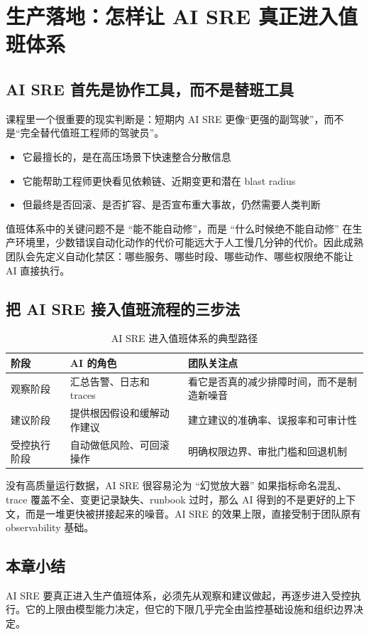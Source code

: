 \section{生产落地：怎样让 AI SRE 真正进入值班体系}

\subsection{AI SRE 首先是协作工具，而不是替班工具}

课程里一个很重要的现实判断是：短期内 AI SRE 更像“更强的副驾驶”，而不是“完全替代值班工程师的驾驶员”。

\begin{itemize}
    \item 它最擅长的，是在高压场景下快速整合分散信息
    \item 它能帮助工程师更快看见依赖链、近期变更和潜在 blast radius
    \item 但最终是否回滚、是否扩容、是否宣布重大事故，仍然需要人类判断
\end{itemize}

\begin{importantbox}{值班体系中的关键问题不是 ``能不能自动修''，而是 ``什么时候绝不能自动修''}
在生产环境里，少数错误自动化动作的代价可能远大于人工慢几分钟的代价。因此成熟团队会先定义自动化禁区：哪些服务、哪些时段、哪些动作、哪些权限绝不能让 AI 直接执行。
\end{importantbox}

\subsection{把 AI SRE 接入值班流程的三步法}

\begin{table}[H]
\centering
\begin{tabular}{p{} p{} p{}}
\toprule
阶段 & AI 的角色 & 团队关注点 \\
\midrule
观察阶段 & 汇总告警、日志和 traces & 看它是否真的减少排障时间，而不是制造新噪音 \\
建议阶段 & 提供根因假设和缓解动作建议 & 建立建议的准确率、误报率和可审计性 \\
受控执行阶段 & 自动做低风险、可回滚操作 & 明确权限边界、审批门槛和回退机制 \\
\bottomrule
\end{tabular}
\caption{AI SRE 进入值班体系的典型路径}
\end{table}

\begin{warningbox}{没有高质量运行数据，AI SRE 很容易沦为 ``幻觉放大器''}
如果指标命名混乱、trace 覆盖不全、变更记录缺失、runbook 过时，那么 AI 得到的不是更好的上下文，而是一堆更快被拼接起来的噪音。AI SRE 的效果上限，直接受制于团队原有 observability 基础。
\end{warningbox}

\subsection{本章小结}

AI SRE 要真正进入生产值班体系，必须先从观察和建议做起，再逐步进入受控执行。它的上限由模型能力决定，但它的下限几乎完全由监控基础设施和组织边界决定。

